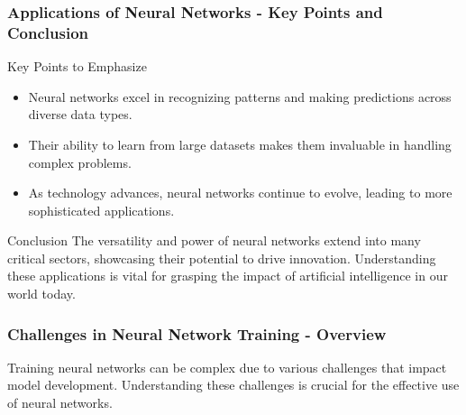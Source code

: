 \documentclass[aspectratio=169]{beamer}
\begin{document}
\begin{frame}[fragile]
  \frametitle{Applications of Neural Networks - Key Points and Conclusion}
  \begin{block}{Key Points to Emphasize}
      \begin{itemize}
          \item Neural networks excel in recognizing patterns and making predictions across diverse data types.
          \item Their ability to learn from large datasets makes them invaluable in handling complex problems.
          \item As technology advances, neural networks continue to evolve, leading to more sophisticated applications.
      \end{itemize}
  \end{block}

  \begin{block}{Conclusion}
      The versatility and power of neural networks extend into many critical sectors, showcasing their potential to drive innovation. 
      Understanding these applications is vital for grasping the impact of artificial intelligence in our world today.
  \end{block}
\end{frame}

\begin{frame}[fragile]
    \frametitle{Challenges in Neural Network Training - Overview}
    Training neural networks can be complex due to various challenges that impact model development. Understanding these challenges is crucial for the effective use of neural networks.
\end{frame}
\end{document}
